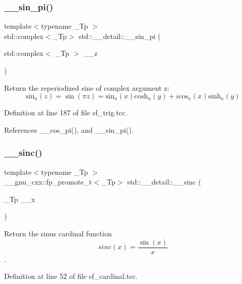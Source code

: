 \subsubsection{\texorpdfstring{\+\_\+\+\_\+sin\+\_\+pi()}{\_\_sin\_pi()}\hspace{0.1cm}{\footnotesize\ttfamily [2/2]}}
{\footnotesize\ttfamily template$<$typename \+\_\+\+Tp $>$ \\
std\+::complex$<$\+\_\+\+Tp$>$ std\+::\+\_\+\+\_\+detail\+::\+\_\+\+\_\+sin\+\_\+pi (\begin{DoxyParamCaption}\item[{std\+::complex$<$ \+\_\+\+Tp $>$}]{\+\_\+\+\_\+z }\end{DoxyParamCaption})}

Return the reperiodized sine of complex argument z\+: \[ \mathrm{sin_\pi}(z) = \sin(\pi z) = \mathrm{sin_\pi}(x) \mathrm{cosh_\pi}(y) + i \mathrm{cos_\pi}(x) \mathrm{sinh_\pi}(y) \] 

Definition at line 187 of file sf\+\_\+trig.\+tcc.



References \+\_\+\+\_\+cos\+\_\+pi(), and \+\_\+\+\_\+sin\+\_\+pi().

\mbox{\label{namespacestd_1_1____detail_ad0730b2b26df36cc8876a1152d895523}} 
\subsubsection{\texorpdfstring{\+\_\+\+\_\+sinc()}{\_\_sinc()}}
{\footnotesize\ttfamily template$<$typename \+\_\+\+Tp $>$ \\
\+\_\+\+\_\+gnu\+\_\+cxx\+::fp\+\_\+promote\+\_\+t$<$\+\_\+\+Tp$>$ std\+::\+\_\+\+\_\+detail\+::\+\_\+\+\_\+sinc (\begin{DoxyParamCaption}\item[{\+\_\+\+Tp}]{\+\_\+\+\_\+x }\end{DoxyParamCaption})}



Return the sinus cardinal function \[ sinc(x) = \frac{\sin(x)}{x} \]. 



Definition at line 52 of file sf\+\_\+cardinal.\+tcc.

\mbox{\label{namespacestd_1_1____detail_ae73746d4ab5c5087c5d302e428490396}} 
